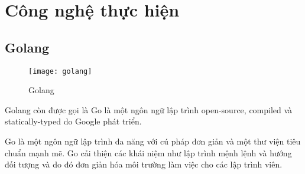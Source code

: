 \section{Công nghệ thực hiện}

\subsection{Golang}

\begin{figure}[ht]
	\centering
	\texttt{[image: golang]}
	\caption{Golang}
\end{figure}

Golang còn được gọi là Go là một ngôn ngữ lập trình open-source, compiled và statically-typed do Google phát triển.

Go là một ngôn ngữ lập trình đa năng với cú pháp đơn giản và một thư viện tiêu chuẩn mạnh mẽ. Go cải thiện các khái niệm như lập trình mệnh lệnh và hướng đối tượng và do đó đơn giản hóa môi trường làm việc cho các lập trình viên.

%
%
%
%
%
%
%
%


